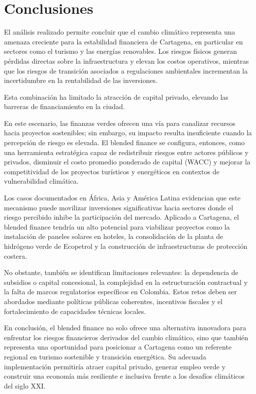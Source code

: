 \section{Conclusiones}

El análisis realizado permite concluir que el cambio climático representa una amenaza creciente para la estabilidad financiera de Cartagena, en particular en sectores como el turismo y las energías renovables. Los riesgos físicos generan pérdidas directas sobre la infraestructura y elevan los costos operativos, mientras que los riesgos de transición asociados a regulaciones ambientales incrementan la incertidumbre en la rentabilidad de las inversiones. 

Esta combinación ha limitado la atracción de capital privado, elevando las barreras de financiamiento en la ciudad.

En este escenario, las finanzas verdes ofrecen una vía para canalizar recursos hacia proyectos sostenibles; sin embargo, su impacto resulta insuficiente cuando la percepción de riesgo es elevada. El blended finance se configura, entonces, como una herramienta estratégica capaz de redistribuir riesgos entre actores públicos y privados, disminuir el costo promedio ponderado de capital (WACC) y mejorar la competitividad de los proyectos turísticos y energéticos en contextos de vulnerabilidad climática.

Los casos documentados en África, Asia y América Latina evidencian que este mecanismo puede movilizar inversiones significativas hacia sectores donde el riesgo percibido inhibe la participación del mercado. Aplicado a Cartagena, el blended finance tendría un alto potencial para viabilizar proyectos como la instalación de paneles solares en hoteles, la consolidación de la planta de hidrógeno verde de Ecopetrol y la construcción de infraestructuras de protección costera.

No obstante, también se identifican limitaciones relevantes: la dependencia de subsidios o capital concesional, la complejidad en la estructuración contractual y la falta de marcos regulatorios específicos en Colombia. Estos retos deben ser abordados mediante políticas públicas coherentes, incentivos fiscales y el fortalecimiento de capacidades técnicas locales.

En conclusión, el blended finance no solo ofrece una alternativa innovadora para enfrentar los riesgos financieros derivados del cambio climático, sino que también representa una oportunidad para posicionar a Cartagena como un referente regional en turismo sostenible y transición energética. Su adecuada implementación permitiría atraer capital privado, generar empleo verde y construir una economía más resiliente e inclusiva frente a los desafíos climáticos del siglo XXI.

